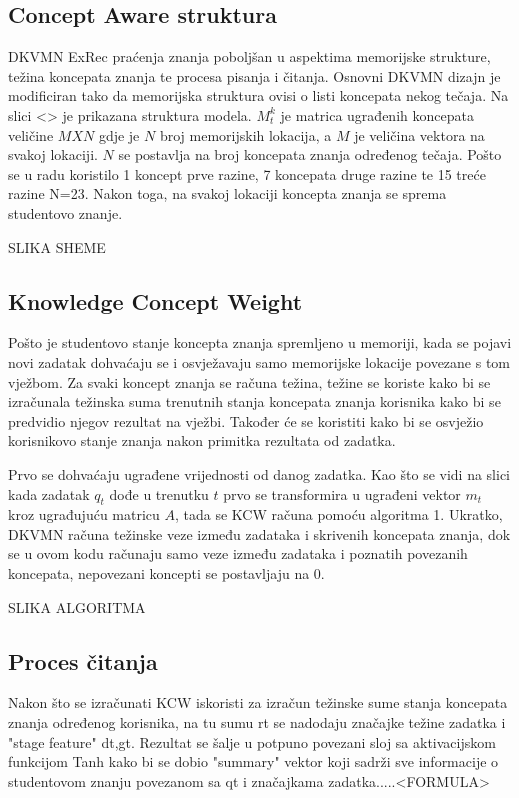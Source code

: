 \documentclass[times, utf8,projekt]{fer}
\begin{document}
\subsection{Concept Aware struktura}
DKVMN ExRec praćenja znanja poboljšan u aspektima memorijske strukture, težina koncepata znanja te procesa pisanja i čitanja. Osnovni DKVMN dizajn je modificiran tako da memorijska struktura ovisi o listi koncepata nekog tečaja. Na slici
<> je prikazana struktura modela. $M^k_t$ je matrica ugrađenih koncepata veličine $M X N$ gdje je $N$ broj memorijskih lokacija, a $M$ je veličina vektora na svakoj lokaciji. $N$ se postavlja na broj koncepata znanja određenog tečaja. Pošto se u radu koristilo 1 koncept prve razine, 7 koncepata druge razine te 15 treće razine N=23. Nakon toga, na svakoj lokaciji koncepta znanja se sprema studentovo znanje.

SLIKA SHEME

\subsection{Knowledge Concept Weight}

Pošto je studentovo stanje koncepta znanja spremljeno u memoriji, kada se pojavi novi zadatak dohvaćaju se i osvježavaju samo memorijske lokacije povezane s tom vježbom. Za svaki koncept znanja se računa težina, težine se koriste kako bi se izračunala težinska suma trenutnih stanja koncepata znanja korisnika kako bi se predvidio njegov rezultat na vježbi. Također će se koristiti kako bi se osvježio korisnikovo stanje znanja nakon primitka rezultata od zadatka.

Prvo se dohvaćaju ugrađene vrijednosti od danog zadatka. Kao što se vidi na slici kada zadatak $q_t$ dođe u trenutku $t$ prvo se transformira u ugrađeni vektor $m_t$ kroz ugrađujuću matricu $A$, tada se KCW računa pomoću algoritma 1. Ukratko, DKVMN računa težinske veze između zadataka i skrivenih koncepata znanja, dok se u ovom kodu računaju samo veze između zadataka i poznatih povezanih koncepata, nepovezani koncepti se postavljaju na 0.

SLIKA ALGORITMA


\subsection{Proces čitanja}

Nakon što se izračunati KCW iskoristi za izračun težinske sume stanja koncepata znanja određenog korisnika, na tu sumu rt se nadodaju značajke težine zadatka i "stage feature" dt,gt. Rezultat se šalje u potpuno povezani sloj sa aktivacijskom funkcijom Tanh kako bi se dobio "summary" vektor koji sadrži sve informacije o studentovom znanju povezanom sa qt i značajkama zadatka.....<FORMULA>
\end{document}
